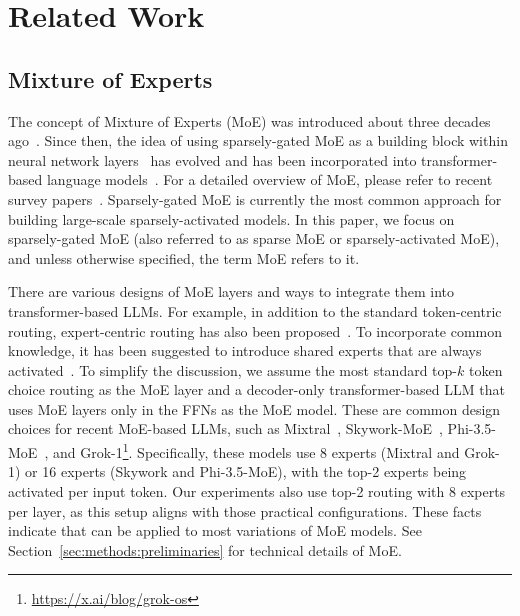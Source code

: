 \section{Related Work}
\subsection{Mixture of Experts}
\label{sec:related_works:moe}

%
%
The concept of Mixture of Experts (MoE) was introduced about three decades ago~\citep{classic_moe_1,classic_moe_2}. Since then, the idea of using sparsely-gated MoE as a building block within neural network layers~\citep{moe_layer_iclr14,shazeer2017} has evolved and has been incorporated into transformer-based language models~\citep{lepikhin2021gshard, Fedus2021SwitchTS}. For a detailed overview of MoE, please refer to recent survey papers~\citep{moe_survey}.
Sparsely-gated MoE is currently the most common approach for building large-scale sparsely-activated models.
In this paper, we focus on sparsely-gated MoE (also referred to as sparse MoE or sparsely-activated MoE), and unless otherwise specified, the term MoE refers to it.




There are various designs of MoE layers and ways to integrate them into transformer-based LLMs. For example, in addition to the standard token-centric routing, expert-centric routing has also been proposed~\citep{expert_routing}. To incorporate common knowledge, it has been suggested to introduce shared experts that are always activated~\citep{dai-etal-2024-deepseekmoe}. To simplify the discussion, %
we assume the most standard top-$k$ token choice routing as the MoE layer and a decoder-only transformer-based LLM that uses MoE layers only in the FFNs as the MoE model. 
These are common design choices for recent MoE-based LLMs, such as Mixtral~\citep{jiang2024mixtralexperts}, Skywork-MoE~\citep{wei2024skyworkmoedeepdivetraining}, Phi-3.5-MoE~\citep{abdin2024phi3technicalreporthighly}, and Grok-1\footnote{\url{https://x.ai/blog/grok-os}}. 
%
Specifically, these models use 8 experts (Mixtral and Grok-1) or 16 experts (Skywork and Phi-3.5-MoE), with the top-2 experts being activated per input token. Our experiments also use top-2 routing with 8 experts per layer, as this setup aligns with those practical configurations.
These facts indicate that \methodname{} can be applied to most variations of MoE models.
%
See Section~\ref{sec:methods:preliminaries} for technical details of MoE.





